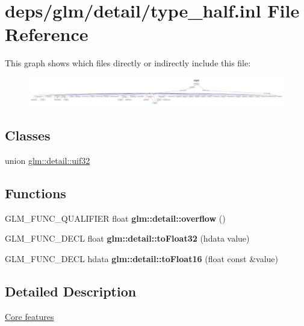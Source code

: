 \hypertarget{type__half_8inl}{}\section{deps/glm/detail/type\+\_\+half.inl File Reference}
\label{type__half_8inl}
This graph shows which files directly or indirectly include this file\+:
\nopagebreak
\begin{figure}[H]
\begin{center}
\leavevmode
\includegraphics[width=350pt]{d3/d63/type__half_8inl__dep__incl}
\end{center}
\end{figure}
\subsection*{Classes}
\begin{DoxyCompactItemize}
\item 
union \hyperlink{unionglm_1_1detail_1_1uif32}{glm\+::detail\+::uif32}
\end{DoxyCompactItemize}
\subsection*{Functions}
\begin{DoxyCompactItemize}
\item 
\mbox{\label{type__half_8inl_a61efe122333bc00e81c57e0927bfdfb3}} 
G\+L\+M\+\_\+\+F\+U\+N\+C\+\_\+\+Q\+U\+A\+L\+I\+F\+I\+ER float {\bfseries glm\+::detail\+::overflow} ()
\item 
\mbox{\label{type__half_8hpp_a8e4719d94d99ee1e625496e04317272b}} 
G\+L\+M\+\_\+\+F\+U\+N\+C\+\_\+\+D\+E\+CL float {\bfseries glm\+::detail\+::to\+Float32} (hdata value)
\item 
\mbox{\label{type__half_8hpp_ac16321696a34b41c55f941b319d50652}} 
G\+L\+M\+\_\+\+F\+U\+N\+C\+\_\+\+D\+E\+CL hdata {\bfseries glm\+::detail\+::to\+Float16} (float const \&value)
\end{DoxyCompactItemize}


\subsection{Detailed Description}
\hyperlink{group__core}{Core features} 